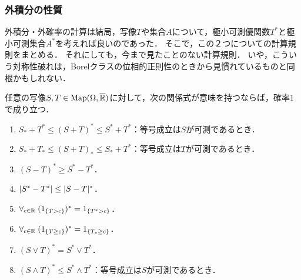 \documentclass[uplatex,dvipdfmx]{jsreport}
\begin{document}
\subsubsection{外積分の性質}

\begin{tcolorbox}[colframe=ForestGreen, colback=ForestGreen!10!white,breakable,colbacktitle=ForestGreen!40!white,coltitle=black,fonttitle=\bfseries\sffamily,
title=]
    外積分・外確率の計算は結局，写像$T$や集合$A$について，極小可測優関数$T^*$と極小可測集合$A^*$を考えれば良いのであった．
    そこで，この２つについての計算規則をまとめる．
    それにしても，今まで見たことのない計算規則．
    いや，こういう対称性破れは，Borelクラスの位相的正則性のときから見慣れているものと同根かもしれない．
\end{tcolorbox}

\begin{lemma}
    任意の写像$S,T\in\mathrm{Map}(\Omega,\overline{\mathbb{R}})$に対して，次の関係式が意味を持つならば，確率$1$で成り立つ．
    \begin{enumerate}
        \item $S_*+T^*\le(S+T)^*\le S^*+T^*$：等号成立は$S$が可測であるとき．
        \item $S_*+T_*\le(S+T)_*\le S_*+T^*$：等号成立は$T$が可測であるとき．
        \item $(S-T)^*\ge S^*-T^*$．
        \item $\lvert S^*-T^*\rvert\le\lvert S-T\rvert^*$．
        \item $\forall_{c\in\mathbb{R}}\;(1_{\left\{T>c\right\}})^*=1_{\left\{T^*>c\right\}}$．
        \item $\forall_{c\in\mathbb{R}}\;(1_{\left\{T\ge c\right\}})^*=1_{\left\{T_*\ge c\right\}}$．
        \item $(S\lor T)^*=S^*\lor T^*$．
        \item $(S\land T)^*\le S^*\land T^*$：等号成立は$S$が可測であるとき．
    \end{enumerate}
\end{lemma}
\end{document}
